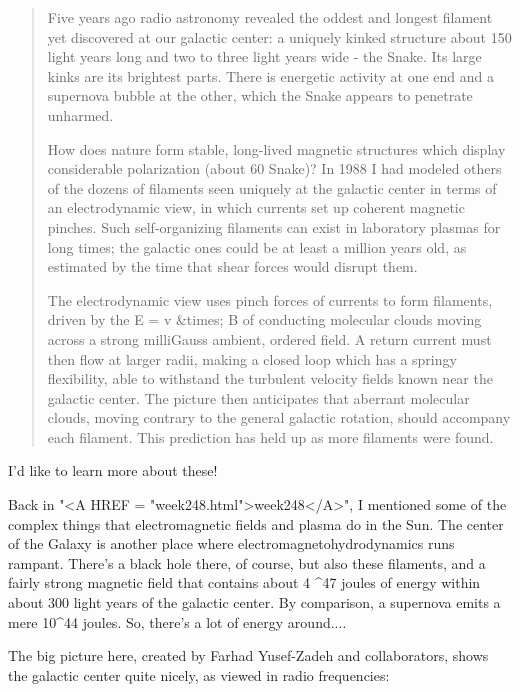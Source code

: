 \begin{quote}
   Five years ago radio astronomy revealed the oddest and longest 
   filament yet discovered at our galactic center: a uniquely kinked 
   structure about 150 light years long and two to three light years 
   wide - the Snake.  Its large kinks are its brightest parts.  There 
   is energetic activity at one end and a supernova bubble at the other, 
   which the Snake appears to penetrate unharmed.

   How does nature form stable, long-lived magnetic structures which 
   display considerable polarization (about 60%
   Snake)?  In 1988 I had modeled others of the dozens of filaments 
   seen uniquely at the galactic center in terms of an electrodynamic 
   view, in which currents set up coherent magnetic pinches.  Such 
   self-organizing filaments can exist in laboratory plasmas for long 
   times; the galactic ones could be at least a million years old, as 
   estimated by the time that shear forces would disrupt them.

   The electrodynamic view uses pinch forces of currents to form filaments, 
   driven by the E = v &times; B of conducting molecular clouds moving across a 
   strong milliGauss ambient, ordered field.  A return current must then 
   flow at larger radii, making a closed loop which has a springy 
   flexibility, able to withstand the turbulent velocity fields known 
   near the galactic center.  The picture then anticipates that aberrant 
   molecular clouds, moving contrary to the general galactic rotation, 
   should accompany each filament.  This prediction has held up as more 
   filaments were found. 
\end{quote}
    

I'd like to learn more about these!  

Back in "<A HREF = "week248.html">week248</A>", I mentioned some of the complex things that 
electromagnetic fields and plasma do in the Sun.  The center of the
Galaxy is another place where electromagnetohydrodynamics runs 
rampant.  There's a black hole there, of course, but also these
filaments, and a fairly strong magnetic field that contains about 
4 ^{47} joules of energy within about 300 light years of the 
galactic center.  By comparison, a supernova emits a mere 10^{44} 
joules.  So, there's a lot of energy around....

The big picture here, created by Farhad Yusef-Zadeh and collaborators, 
shows the galactic center quite nicely, as viewed in radio frequencies:


